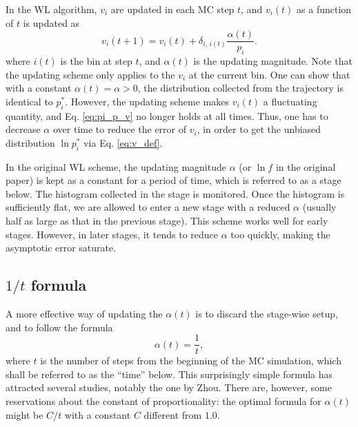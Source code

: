 \documentclass[reprint]{revtex4-1}
\begin{document}
In the WL algorithm, $v_i$ are updated
in each MC step $t$,
and $v_i(t)$ as a function of $t$
is updated as
%
\begin{equation}
  v_i(t+1)
  =
  v_i(t)
  +
  \delta_{i, \, i(t)}
  \frac{ \alpha(t) } { p_i }.
  \label{eq:wl_update}
\end{equation}
%
where $i(t)$ is the bin at step $t$,
and $\alpha(t)$ is the updating magnitude.
%
Note that the updating scheme only applies
to the $v_i$ at the current bin.
%
One can show that with a constant $\alpha(t) = \alpha > 0$,
the distribution collected from
the trajectory is identical to $p^*_i$.
%
However, the updating scheme
makes $v_i(t)$ a fluctuating quantity,
and Eq. \eqref{eq:pi_p_v} no longer holds
at all times.
%
Thus, one has to decrease $\alpha$ over time
to reduce the error of $v_i$,
in order to get the unbiased distribution
$\ln p_i^*$ via Eq. \eqref{eq:v_def}.





In the original WL scheme,
the updating magnitude $\alpha$ (or $\ln f$
in the original paper) is kept as a constant
for a period of time,
which is referred to as a stage below.
%
The histogram collected in the stage is monitored.
%
Once the histogram is sufficiently flat,
we are allowed to enter a new stage
with a reduced $\alpha$
(usually half as large as
that in the previous stage).
%
This scheme works well for early stages.
%
However, in later stages, it tends to reduce $\alpha$
too quickly, making the asymptotic error
saturate.



\subsection{$1/t$ formula}



A more effective way
of updating the $\alpha(t)$
is to discard the stage-wise setup,
and to follow the formula
%
\begin{equation}
  \alpha(t) = \frac{1}{t},
  \label{eq:alpha_invt}
\end{equation}
%
where $t$ is the number of steps
from the beginning of the MC simulation,
which shall be referred to as the ``time'' below.
%
This surprisingly simple formula has attracted
several studies, notably the one by Zhou.
%
There are, however, some reservations about
the constant of proportionality:
the optimal formula for $\alpha(t)$
might be $C/t$ with a constant $C$
different from $1.0$.
\end{document}
